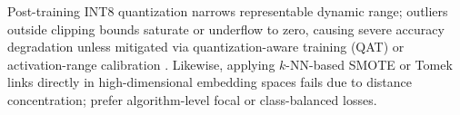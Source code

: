 \documentclass[../../../../master.tex]{subfiles}
\begin{document}
\begin{pitfall}
Post-training INT8 quantization narrows representable dynamic range; outliers outside clipping bounds saturate or underflow to zero, causing severe accuracy degradation unless mitigated via quantization-aware training (QAT) or activation-range calibration . Likewise, applying $k$-NN-based SMOTE or Tomek links directly in high-dimensional embedding spaces fails due to distance concentration; prefer algorithm-level focal or class-balanced losses.
\end{pitfall}

\endgroup
\end{document}
